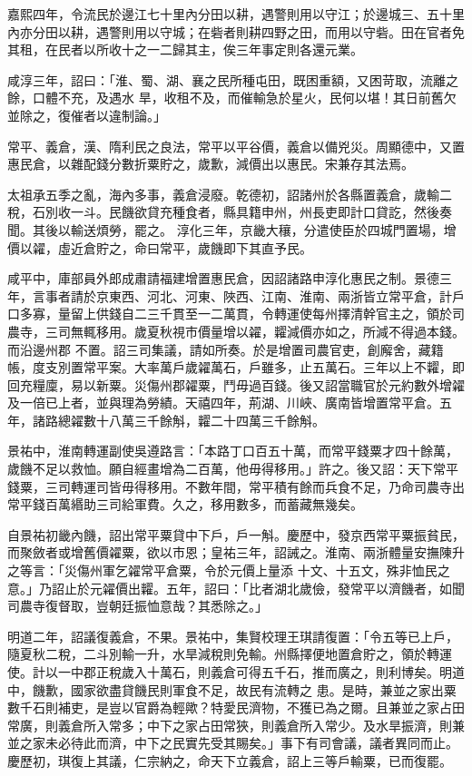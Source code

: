 \begin{pinyinscope}
 嘉熙四年，令流民於邊江七十里內分田以耕，遇警則用以守江；於邊城三、五十里內亦分田以耕，遇警則用以守城；在砦者則耕四野之田，而用以守砦。田在官者免其租，在民者以所收十之一二歸其主，俟三年事定則各還元業。



 咸淳三年，詔曰：「淮、蜀、湖、襄之民所種屯田，既困重額，又困苛取，流離之餘，口體不充，及遇水
 旱，收租不及，而催輸急於星火，民何以堪！其日前舊欠並除之，復催者以違制論。」



 常平、義倉，漢、隋利民之良法，常平以平谷價，義倉以備兇災。周顯德中，又置惠民倉，以雜配錢分數折粟貯之，歲歉，減價出以惠民。宋兼存其法焉。



 太祖承五季之亂，海內多事，義倉浸廢。乾德初，詔諸州於各縣置義倉，歲輸二稅，石別收一斗。民饑欲貸充種食者，縣具籍申州，州長吏即計口貸訖，然後奏聞。其後以輸送煩勞，罷之。
 淳化三年，京畿大穰，分遣使臣於四城門置場，增價以糴，虛近倉貯之，命曰常平，歲饑即下其直予民。



 咸平中，庫部員外郎成肅請福建增置惠民倉，因詔諸路申淳化惠民之制。景德三年，言事者請於京東西、河北、河東、陜西、江南、淮南、兩浙皆立常平倉，計戶口多寡，量留上供錢自二三千貫至一二萬貫，令轉運使每州擇清幹官主之，領於司農寺，三司無輒移用。歲夏秋視市價量增以糴，糶減價亦如之，所減不得過本錢。而沿邊州郡
 不置。詔三司集議，請如所奏。於是增置司農官吏，創廨舍，藏籍帳，度支別置常平案。大率萬戶歲糴萬石，戶雖多，止五萬石。三年以上不糶，即回充糧廩，易以新粟。災傷州郡糴粟，鬥毋過百錢。後又詔當職官於元約數外增糴及一倍已上者，並與理為勞績。天禧四年，荊湖、川峽、廣南皆增置常平倉。五年，諸路總糴數十八萬三千餘斛，糶二十四萬三千餘斛。



 景祐中，淮南轉運副使吳遵路言：「本路丁口百五十萬，而常平錢粟才四十餘萬，
 歲饑不足以救恤。願自經畫增為二百萬，他毋得移用。」許之。後又詔：天下常平錢粟，三司轉運司皆毋得移用。不數年間，常平積有餘而兵食不足，乃命司農寺出常平錢百萬緡助三司給軍費。久之，移用數多，而蓄藏無幾矣。



 自景祐初畿內饑，詔出常平粟貸中下戶，戶一斛。慶歷中，發京西常平粟振貧民，而聚斂者或增舊價糴粟，欲以市恩；皇祐三年，詔誡之。淮南、兩浙體量安撫陳升之等言：「災傷州軍乞糴常平倉粟，令於元價上量添
 十文、十五文，殊非恤民之意。」乃詔止於元糴價出糶。五年，詔曰：「比者湖北歲儉，發常平以濟饑者，如聞司農寺復督取，豈朝廷振恤意哉？其悉除之。」



 明道二年，詔議復義倉，不果。景祐中，集賢校理王琪請復置：「令五等已上戶，隨夏秋二稅，二斗別輸一升，水旱減稅則免輸。州縣擇便地置倉貯之，領於轉運使。計以一中郡正稅歲入十萬石，則義倉可得五千石，推而廣之，則利博矣。明道中，饑歉，國家欲盡貸饑民則軍食不足，故民有流轉之
 患。是時，兼並之家出粟數千石則補吏，是豈以官爵為輕歟？特愛民濟物，不獲已為之爾。且兼並之家占田常廣，則義倉所入常多；中下之家占田常狹，則義倉所入常少。及水旱振濟，則兼並之家未必待此而濟，中下之民實先受其賜矣。」事下有司會議，議者異同而止。慶歷初，琪復上其議，仁宗納之，命天下立義倉，詔上三等戶輸粟，已而復罷。




\end{pinyinscope}
